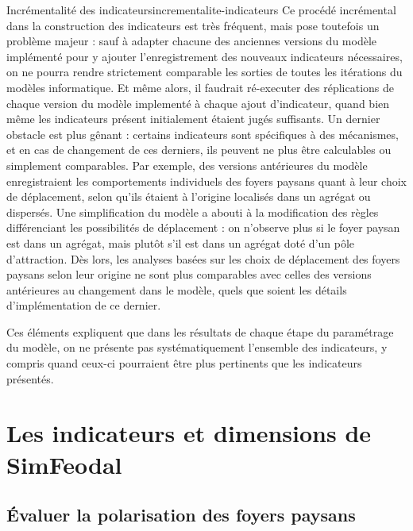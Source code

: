\begin{encadre}{Incrémentalité des indicateurs}{incrementalite-indicateurs}
Ce procédé incrémental dans la construction des indicateurs est très fréquent, mais pose toutefois un problème majeur :
sauf à adapter chacune des anciennes versions du modèle implémenté pour y ajouter l'enregistrement des nouveaux indicateurs nécessaires, on ne pourra rendre strictement comparable les sorties de toutes les itérations du modèles informatique.
Et même alors, il faudrait ré-executer des réplications de chaque version du modèle implementé à chaque ajout d'indicateur, quand bien même les indicateurs présent initialement étaient jugés suffisants.
Un dernier obstacle est plus gênant :
certains indicateurs sont spécifiques à des mécanismes, et en cas de changement de ces derniers, ils peuvent ne plus être calculables ou simplement comparables.
Par exemple, des versions antérieures du modèle enregistraient les comportements individuels des foyers paysans quant à leur \og choix\fg{} de déplacement, selon qu'ils étaient à l'origine localisés dans un agrégat ou dispersés.
Une simplification du modèle a abouti à la modification des règles différenciant les possibilités de déplacement :
on n'observe plus si le foyer paysan est dans un agrégat, mais plutôt s'il est dans un agrégat doté d'un pôle d'attraction.
Dès lors, les analyses basées sur les choix de déplacement des foyers paysans selon leur origine ne sont plus comparables avec celles des versions antérieures au changement dans le modèle, quels que soient les détails d'implémentation de ce dernier.

Ces éléments expliquent que dans les résultats de chaque étape du paramétrage du modèle, on ne présente pas systématiquement l'ensemble des indicateurs, y compris quand ceux-ci pourraient être plus pertinents que les indicateurs présentés.
\end{encadre}


\pagebreak

\section{Les indicateurs et dimensions de SimFeodal}

\subsection{Évaluer la polarisation des foyers paysans \label{subsub:polarisation}}

